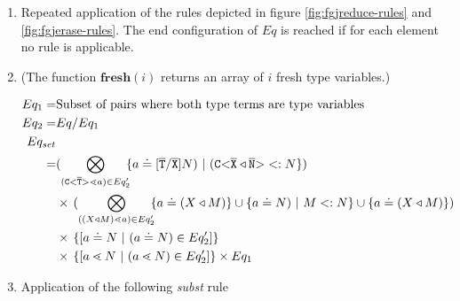 \begin{enumerate}
\item Repeated application of the rules depicted in figure \ref{fig:fgjreduce-rules} and \ref{fig:fgjerase-rules}.
The end configuration of $Eq$ is reached if for each element
no rule is applicable.

\item
(The function $\textbf{fresh}(i)$ returns an array of $i$ fresh type variables.)

\begin{align*}
Eq_1 =& \text{Subset of pairs where both type terms are type variables}\\
Eq_2 =& Eq / Eq_1 \\
Eq_{set}\\ 
    = 
    & %
    (\displaystyle{\bigotimes_{(\exptype{C}{\overline{T}} \lessdot a) \in Eq'_2}}\!\!
    \set{a \doteq [\ol{T}/\ol{X}]N ) \ | \ (\exptype{C}{\overline{X} \triangleleft \ol{N}} <: N})\\
    & \times\, 
      (\displaystyle{\bigotimes_{((X \triangleleft M)\lessdot a) \in Eq'_2}}\!\!
      \set{a \doteq (X \triangleleft M)} \cup
      \set{a \doteq N ) \ | \ M <: N } \cup \set{a \doteq (X \triangleleft M)})\\
      & \times\, \set{[a \doteq N \ | \  (a \doteq N) \in Eq'_2]} \\
      & \times\, \set{[a \lessdot N \ | \  (a \lessdot N) \in Eq'_2]} \times Eq_1 \\
\end{align*}

\item \label{subst-step}  Application of the following \emph{subst} rule
    

\end{enumerate}
